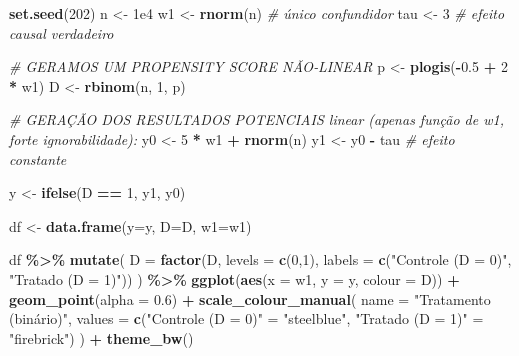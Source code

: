 \documentclass[
]{article}
\newenvironment{Shaded}{\begin{snugshade}}{\end{snugshade}}
\newcommand{\AttributeTok}[1]{\textcolor[rgb]{0.13,0.29,0.53}{#1}}
\newcommand{\CommentTok}[1]{\textcolor[rgb]{0.56,0.35,0.01}{\textit{#1}}}
\newcommand{\DecValTok}[1]{\textcolor[rgb]{0.00,0.00,0.81}{#1}}
\newcommand{\FloatTok}[1]{\textcolor[rgb]{0.00,0.00,0.81}{#1}}
\newcommand{\FunctionTok}[1]{\textcolor[rgb]{0.13,0.29,0.53}{\textbf{#1}}}
\newcommand{\NormalTok}[1]{#1}
\newcommand{\OtherTok}[1]{\textcolor[rgb]{0.56,0.35,0.01}{#1}}
\newcommand{\SpecialCharTok}[1]{\textcolor[rgb]{0.81,0.36,0.00}{\textbf{#1}}}
\newcommand{\StringTok}[1]{\textcolor[rgb]{0.31,0.60,0.02}{#1}}
\begin{document}
\begin{Shaded}
\begin{Highlighting}[]
\FunctionTok{set.seed}\NormalTok{(}\DecValTok{202}\NormalTok{)}
\NormalTok{n  }\OtherTok{\textless{}{-}} \FloatTok{1e4}
\NormalTok{w1 }\OtherTok{\textless{}{-}} \FunctionTok{rnorm}\NormalTok{(n)                       }\CommentTok{\# único confundidor}
\NormalTok{tau }\OtherTok{\textless{}{-}} \DecValTok{3}                             \CommentTok{\# efeito causal verdadeiro}

\CommentTok{\# GERAMOS UM PROPENSITY SCORE NÃO‐LINEAR}
\NormalTok{p  }\OtherTok{\textless{}{-}} \FunctionTok{plogis}\NormalTok{(}\SpecialCharTok{{-}}\FloatTok{0.5} \SpecialCharTok{+} \DecValTok{2} \SpecialCharTok{*}\NormalTok{ w1) }
\NormalTok{D  }\OtherTok{\textless{}{-}} \FunctionTok{rbinom}\NormalTok{(n, }\DecValTok{1}\NormalTok{, p)}

\CommentTok{\# GERAÇÃO DOS RESULTADOS POTENCIAIS linear (apenas função de w1, forte ignorabilidade):}
\NormalTok{y0 }\OtherTok{\textless{}{-}}  \DecValTok{5} \SpecialCharTok{*}\NormalTok{ w1 }\SpecialCharTok{+} \FunctionTok{rnorm}\NormalTok{(n)}
\NormalTok{y1 }\OtherTok{\textless{}{-}}\NormalTok{ y0 }\SpecialCharTok{{-}}\NormalTok{ tau                       }\CommentTok{\# efeito constante}

\NormalTok{y  }\OtherTok{\textless{}{-}} \FunctionTok{ifelse}\NormalTok{(D }\SpecialCharTok{==} \DecValTok{1}\NormalTok{, y1, y0)}



\NormalTok{df }\OtherTok{\textless{}{-}} \FunctionTok{data.frame}\NormalTok{(}\AttributeTok{y=}\NormalTok{y, }\AttributeTok{D=}\NormalTok{D, }\AttributeTok{w1=}\NormalTok{w1)}

\NormalTok{df }\SpecialCharTok{\%\textgreater{}\%}
  \FunctionTok{mutate}\NormalTok{(}
    \AttributeTok{D =} \FunctionTok{factor}\NormalTok{(D, }\AttributeTok{levels =} \FunctionTok{c}\NormalTok{(}\DecValTok{0}\NormalTok{,}\DecValTok{1}\NormalTok{),}
               \AttributeTok{labels =} \FunctionTok{c}\NormalTok{(}\StringTok{"Controle (D = 0)"}\NormalTok{, }\StringTok{"Tratado (D = 1)"}\NormalTok{))}
\NormalTok{  ) }\SpecialCharTok{\%\textgreater{}\%}
  \FunctionTok{ggplot}\NormalTok{(}\FunctionTok{aes}\NormalTok{(}\AttributeTok{x =}\NormalTok{ w1, }\AttributeTok{y =}\NormalTok{ y, }\AttributeTok{colour =}\NormalTok{ D)) }\SpecialCharTok{+}
  \FunctionTok{geom\_point}\NormalTok{(}\AttributeTok{alpha =} \FloatTok{0.6}\NormalTok{) }\SpecialCharTok{+}
  \FunctionTok{scale\_colour\_manual}\NormalTok{(}
    \AttributeTok{name   =} \StringTok{"Tratamento (binário)"}\NormalTok{,}
    \AttributeTok{values =} \FunctionTok{c}\NormalTok{(}\StringTok{"Controle (D = 0)"} \OtherTok{=} \StringTok{"steelblue"}\NormalTok{, }
               \StringTok{"Tratado (D = 1)"}  \OtherTok{=} \StringTok{"firebrick"}\NormalTok{)}
\NormalTok{  ) }\SpecialCharTok{+} \FunctionTok{theme\_bw}\NormalTok{()}
\end{Highlighting}
\end{Shaded}
\end{document}
